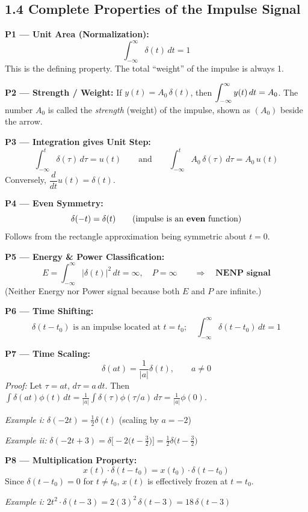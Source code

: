 \documentclass[10pt,a4paper]{article}
\newcommand{\Int}{\displaystyle\int_{-\infty}^{\infty}}
\newcommand{\Intt}{\displaystyle\int_{-\infty}^{t}}
\begin{document}
\subsection*{1.4 Complete Properties of the Impulse Signal}

\begin{propbox}
\textbf{P1 --- Unit Area (Normalization):}
\[
  \Int \delta(t)\,dt = 1
\]
This is the defining property. The total ``weight'' of the impulse is always 1.

\medskip
\textbf{P2 --- Strength / Weight:}
If $y(t) = A_0\,\delta(t)$, then $\displaystyle\Int y(t)\,dt = A_0$.
The number $A_0$ is called the \emph{strength} (weight) of the impulse, shown as $(A_0)$ beside the arrow.

\medskip
\textbf{P3 --- Integration gives Unit Step:}
\[
  \Intt \delta(\tau)\,d\tau = u(t) \qquad \text{and} \qquad \Intt A_0\,\delta(\tau)\,d\tau = A_0\,u(t)
\]
Conversely, $\dfrac{d}{dt}u(t) = \delta(t)$.

\medskip
\textbf{P4 --- Even Symmetry:}
\[
  \delta(-t) = \delta(t) \qquad (\text{impulse is an \textbf{even} function})
\]
Follows from the rectangle approximation being symmetric about $t=0$.

\medskip
\textbf{P5 --- Energy \& Power Classification:}
\[
  E = \Int |\delta(t)|^2\,dt = \infty, \quad P = \infty \qquad \Rightarrow \quad \textbf{NENP signal}
\]
(Neither Energy nor Power signal because both $E$ and $P$ are infinite.)

\medskip
\textbf{P6 --- Time Shifting:}
\[
  \delta(t - t_0) \text{ is an impulse located at } t = t_0; \quad
  \int_{-\infty}^{\infty}\delta(t-t_0)\,dt = 1
\]

\medskip
\textbf{P7 --- Time Scaling:}
\[
  \delta(at) = \frac{1}{|a|}\delta(t), \qquad a \neq 0
\]
\textit{Proof:} Let $\tau = at$, $d\tau = a\,dt$. Then $\int\delta(at)\phi(t)\,dt = \frac{1}{|a|}\int\delta(\tau)\phi(\tau/a)\,d\tau = \frac{1}{|a|}\phi(0)$.

\quad\textit{Example i:} $\delta(-2t) = \tfrac{1}{2}\delta(t)$ \hfill (scaling by $a=-2$)

\quad\textit{Example ii:} $\delta(-2t+3) = \delta\bigl[-2\bigl(t-\tfrac{3}{2}\bigr)\bigr] = \tfrac{1}{2}\delta\bigl(t-\tfrac{3}{2}\bigr)$

\medskip
\textbf{P8 --- Multiplication Property:}
\[
  x(t)\cdot\delta(t - t_0) = x(t_0)\cdot\delta(t - t_0)
\]
Since $\delta(t-t_0)=0$ for $t\neq t_0$, $x(t)$ is effectively frozen at $t=t_0$.

\quad\textit{Example i:} $2t^2\cdot\delta(t-3) = 2(3)^2\,\delta(t-3) = 18\,\delta(t-3)$


\end{propbox}
\end{document}
